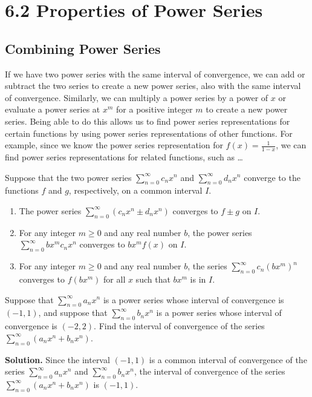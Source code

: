 \documentclass{report}
\begin{document}
    \pagebreak \bigbreak \noindent 
    \section*{6.2 Properties of Power Series}
    \bigbreak \noindent 
    \subsection*{Combining Power Series}
    \bigbreak \noindent 
    If we have two power series with the same interval of convergence, we can add or subtract the two series to create a new power series, also with the same interval of convergence. Similarly, we can multiply a power series by a power of \( x \) or evaluate a power series at \( x^m \) for a positive integer \( m \) to create a new power series. Being able to do this allows us to find power series representations for certain functions by using power series representations of other functions. For example, since we know the power series representation for \( f(x) = \frac{1}{1-x} \), we can find power series representations for related functions, such as \ldots

    \bigbreak \noindent 

    \begin{thrm}
        Suppose that the two power series \(\sum_{n=0}^{\infty} c_n x^n\) and \(\sum_{n=0}^{\infty} d_n x^n\) converge to the functions \(f\) and \(g\), respectively, on a common interval \(I\).
    \begin{enumerate}[label=(\roman*)]
        \item The power series \(\sum_{n=0}^{\infty} (c_n x^n \pm d_n x^n)\) converges to \(f \pm g\) on \(I\).
        \item For any integer \(m \geq 0\) and any real number \(b\), the power series \(\sum_{n=0}^{\infty} b x^m c_n x^n\) converges to \(b x^m f(x)\) on \(I\).
        \item For any integer \(m \geq 0\) and any real number \(b\), the series \(\sum_{n=0}^{\infty} c_n (b x^m)^n\) converges to \(f(b x^m)\) for all \(x\) such that \(b x^m\) is in \(I\).
    \end{enumerate}
    \end{thrm}

    \bigbreak \noindent 
    \begin{eg}
       Suppose that \(\sum_{n=0}^{\infty} a_n x^n\) is a power series whose interval of convergence is \((-1, 1)\), and suppose that \(\sum_{n=0}^{\infty} b_n x^n\) is a power series whose interval of convergence is \((-2, 2)\).
       \bigbreak \noindent 
       Find the interval of convergence of the series \(\sum_{n=0}^{\infty} (a_n x^n + b_n x^n)\).
    \end{eg}
    \bigbreak \noindent 
    \textbf{Solution.} Since the interval \((-1, 1)\) is a common interval of convergence of the series \(\sum_{n=0}^{\infty} a_n x^n\) and \(\sum_{n=0}^{\infty} b_n x^n\), the interval of convergence of the series \(\sum_{n=0}^{\infty} (a_n x^n + b_n x^n)\) is \((-1, 1)\).
\end{document}
